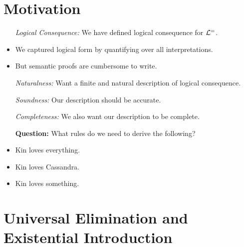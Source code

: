 \documentclass[a4paper, 11pt]{article} %
\begin{document}
\section*{Motivation}

\begin{itemize}
  \item[\it Logical Consequence:] We have defined logical consequence for $\mathcal{L}^=$.
    \item We captured logical form by quantifying over all interpretations.
    \item But semantic proofs are cumbersome to write.
  \item[\it Naturalness:] Want a finite and natural description of logical consequence.
  \item[\it Soundness:] Our description should be accurate.
  \item[\it Completeness:] We also want our description to be complete.
  \item[\bf Question:] What rules do we need to derive the following?
    \item Kin loves everything.
    \item Kin loves Cassandra.
    \item Kin loves something.
\end{itemize}






\section*{Universal Elimination and Existential Introduction}
\end{document}

